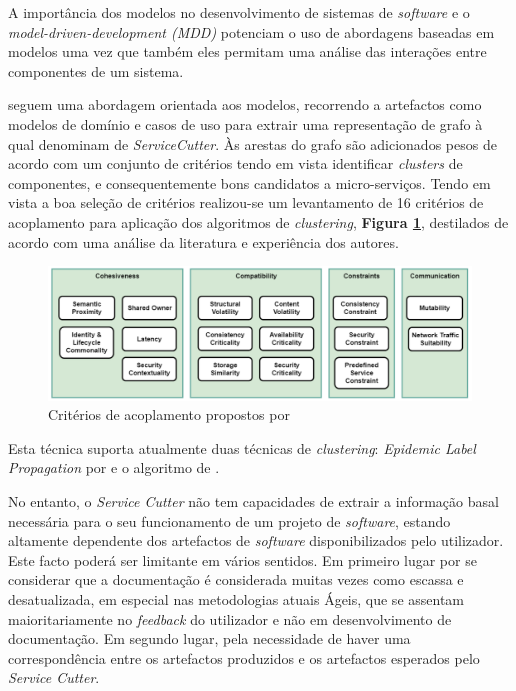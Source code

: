    A importância dos modelos no desenvolvimento de sistemas de \textit{software} e o \textit{model-driven-development (MDD)} potenciam o uso de abordagens baseadas em modelos uma vez que também eles permitam uma análise das interações entre componentes de um sistema.
   
   \cite{gysel16_service_cutter} seguem uma abordagem orientada aos modelos, recorrendo a artefactos como modelos de domínio e casos de uso para extrair uma representação de grafo à qual denominam de \textit{ServiceCutter}. Às arestas do grafo são adicionados pesos de acordo com um conjunto de critérios tendo em vista identificar \textit{clusters} de componentes, e consequentemente bons candidatos a micro-serviços. Tendo em vista a boa seleção de critérios realizou-se um levantamento de 16 critérios de acoplamento para aplicação dos algoritmos de \textit{clustering}, \textbf{Figura \ref{fig:service_cutter_16}}, destilados de acordo com uma análise da literatura e experiência dos autores.
   
	\begin{figure}[h]
     	\begin{center}
     		\includegraphics[width=\textwidth]{img/service_cutter_16_criteria.png}
     	\end{center}
     	\caption{Critérios de acoplamento propostos por \cite{gysel16_service_cutter}}
     	\label{fig:service_cutter_16}
 	\end{figure}
   
   Esta técnica suporta atualmente duas técnicas de \textit{clustering}: \textit{Epidemic Label Propagation} por \cite{leung2009TowardsRC} e o algoritmo de \cite{girvan01_community_structure_cluster}.
   
   No entanto, o \textit{Service Cutter} não tem capacidades de extrair a informação basal necessária para o seu funcionamento de um projeto de \textit{software}, estando altamente dependente dos artefactos de \textit{software} disponibilizados pelo utilizador. Este facto poderá ser limitante em vários sentidos. Em primeiro lugar por se considerar que a documentação é considerada muitas vezes como escassa e desatualizada, em especial nas metodologias atuais Ágeis, que se assentam maioritariamente no \textit{feedback} do utilizador e não em desenvolvimento de documentação. Em segundo lugar, pela necessidade de haver uma correspondência entre os artefactos produzidos e os artefactos esperados pelo \textit{Service Cutter}. 
    
